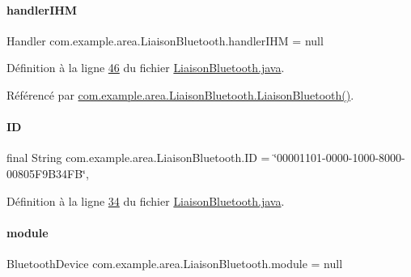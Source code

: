 \paragraph{\texorpdfstring{handler\+I\+HM}{handlerIHM}}
{\footnotesize\ttfamily Handler com.\+example.\+area.\+Liaison\+Bluetooth.\+handler\+I\+HM = null\hspace{0.3cm}{\ttfamily [private]}}



Définition à la ligne \hyperlink{_liaison_bluetooth_8java_source_l00046}{46} du fichier \hyperlink{_liaison_bluetooth_8java_source}{Liaison\+Bluetooth.\+java}.



Référencé par \hyperlink{_liaison_bluetooth_8java_source_l00048}{com.\+example.\+area.\+Liaison\+Bluetooth.\+Liaison\+Bluetooth()}.

\mbox{\label{classcom_1_1example_1_1area_1_1_liaison_bluetooth_a8f4d17b8ac09c7ba9213163de86fb669}} 
\paragraph{\texorpdfstring{ID}{ID}}
{\footnotesize\ttfamily final String com.\+example.\+area.\+Liaison\+Bluetooth.\+ID = \char`\"{}00001101-\/0000-\/1000-\/8000-\/00805\+F9\+B34\+F\+B\char`\"{}\hspace{0.3cm}{\ttfamily [static]}, {\ttfamily [private]}}



Définition à la ligne \hyperlink{_liaison_bluetooth_8java_source_l00034}{34} du fichier \hyperlink{_liaison_bluetooth_8java_source}{Liaison\+Bluetooth.\+java}.

\mbox{\label{classcom_1_1example_1_1area_1_1_liaison_bluetooth_a80068a7178f6c84eae7bab50cf0a784a}} 
\paragraph{\texorpdfstring{module}{module}}
{\footnotesize\ttfamily Bluetooth\+Device com.\+example.\+area.\+Liaison\+Bluetooth.\+module = null\hspace{0.3cm}{\ttfamily [private]}}



